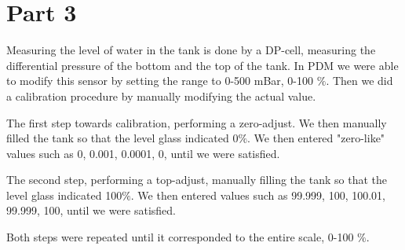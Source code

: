 \newpage
\section{Part 3}
Measuring the level of water in the tank is done by a DP-cell, measuring the differential pressure of the bottom and the top of the tank. In PDM we were able to modify this sensor by setting the range to 0-500 mBar, 0-100 $\%$. Then we did a calibration procedure by manually modifying the actual value.

The first step towards calibration, performing a zero-adjust. We then manually filled the tank so that the level glass indicated 0$\%$. We then entered "zero-like" values such as 0, 0.001, 0.0001, 0, until we were satisfied.

The second step, performing a top-adjust, manually filling the tank so that the level glass indicated 100$\%$. We then entered values such as 99.999, 100, 100.01, 99.999, 100, until we were satisfied.

Both steps were repeated until it corresponded to the entire scale, 0-100 $\%$. 